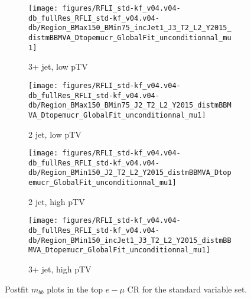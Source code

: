 \begin{figure}[!htbp]\captionsetup{justification=centering}
    \centering
\begin{subfigure}[t]{0.45000\textwidth}\centering\texttt{[image: figures/RFLI\_std-kf\_v04.v04-db\_fullRes\_RFLI\_std-kf\_v04.v04-db/Region\_BMax150\_BMin75\_incJet1\_J3\_T2\_L2\_Y2015\_distmBBMVA\_Dtopemucr\_GlobalFit\_unconditionnal\_mu1]}\caption{3+ jet, low pTV}\end{subfigure}
\begin{subfigure}[t]{0.45000\textwidth}\centering\texttt{[image: figures/RFLI\_std-kf\_v04.v04-db\_fullRes\_RFLI\_std-kf\_v04.v04-db/Region\_BMax150\_BMin75\_J2\_T2\_L2\_Y2015\_distmBBMVA\_Dtopemucr\_GlobalFit\_unconditionnal\_mu1]}\caption{2 jet, low pTV}\end{subfigure}
\begin{subfigure}[t]{0.45000\textwidth}\centering\texttt{[image: figures/RFLI\_std-kf\_v04.v04-db\_fullRes\_RFLI\_std-kf\_v04.v04-db/Region\_BMin150\_J2\_T2\_L2\_Y2015\_distmBBMVA\_Dtopemucr\_GlobalFit\_unconditionnal\_mu1]}\caption{2 jet, high pTV}\end{subfigure}
\begin{subfigure}[t]{0.45000\textwidth}\centering\texttt{[image: figures/RFLI\_std-kf\_v04.v04-db\_fullRes\_RFLI\_std-kf\_v04.v04-db/Region\_BMin150\_incJet1\_J3\_T2\_L2\_Y2015\_distmBBMVA\_Dtopemucr\_GlobalFit\_unconditionnal\_mu1]}\caption{3+ jet, high pTV}\end{subfigure}
  \caption{Postfit $m_{bb}$ plots in the top $e-\mu$ CR for the standard variable set.}
  \label{fig:stdPostfittopemuvz}
\end{figure}

